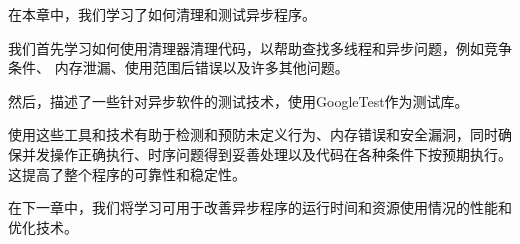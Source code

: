 在本章中，我们学习了如何清理和测试异步程序。

我们首先学习如何使用清理器清理代码，以帮助查找多线程和异步问题，例如竞争条件、 内存泄漏、使用范围后错误以及许多其他问题。

然后，描述了一些针对异步软件的测试技术，使用GoogleTest作为测试库。

使用这些工具和技术有助于检测和预防未定义行为、内存错误和安全漏洞，同时确保并发操作正确执行、时序问题得到妥善处理以及代码在各种条件下按预期执行。这提高了整个程序的可靠性和稳定性。

在下一章中，我们将学习可用于改善异步程序的运行时间和资源使用情况的性能和优化技术。